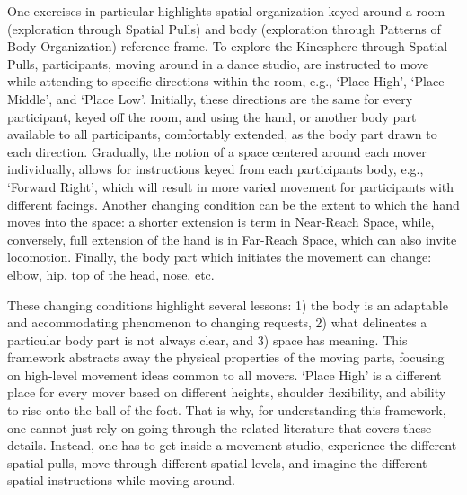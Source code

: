 \documentclass[arts,article,submit,moreauthors,pdftex,10pt,a4paper]{mdpi}
\begin{document}
One exercises in particular highlights spatial organization keyed around a room (exploration through Spatial Pulls) and body (exploration through Patterns of Body Organization) reference frame.
To explore the Kinesphere through Spatial Pulls, participants, moving around in a dance studio, are instructed to move while attending to specific directions within the room, e.g., `Place High', `Place Middle', and `Place Low'.  Initially, these directions are the same for every participant, keyed off the room, and using the hand, or another body part available to all participants, comfortably extended, as the body part drawn to each direction.  Gradually, the notion of a space centered around each mover individually, allows for instructions keyed from each participants body, e.g., `Forward Right', which will result in more varied movement for participants with different facings.  Another changing condition can be the extent to which the hand moves into the space: a shorter extension is term in Near-Reach Space, while, conversely, full extension of the hand is in Far-Reach Space, which can also invite locomotion.  Finally, the body part which initiates the movement can change:  elbow, hip, top of the head, nose, etc.

These changing conditions highlight several lessons:  1) the body is an adaptable and accommodating phenomenon to changing requests, 2) what delineates a particular body part is not always clear, and 3) space has meaning.   This framework abstracts away the physical properties of the moving parts, focusing on high-level movement ideas common to all movers.  `Place High' is a different place for every mover based on different heights, shoulder flexibility, and ability to rise onto the ball of the foot.  That is why, for understanding this framework, one cannot just rely on going through the related literature that covers these details. Instead, one has to get inside a movement studio, experience the different spatial pulls, move through different spatial levels, and imagine the different spatial instructions while moving around. 

\end{document}
